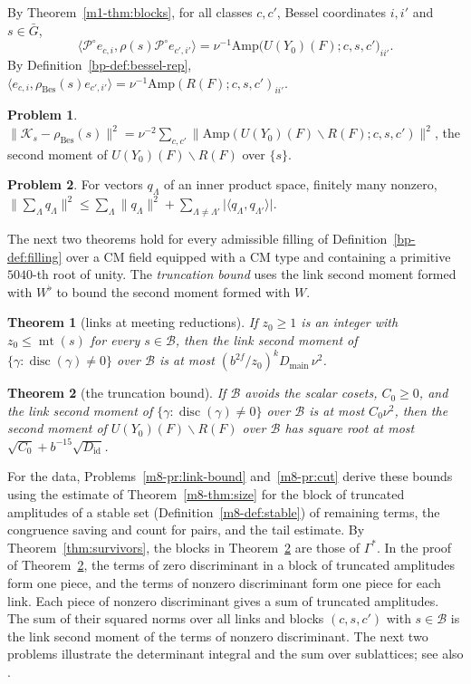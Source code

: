 \documentclass[reqno]{amsart}
\theoremstyle{definition}
\newtheorem{problem}{Problem}[section]
\theoremstyle{plain}
\newtheorem{theorem}{Theorem}[section]
\theoremstyle{remark}
\newcommand{\Kc}{\mathcal K}
\newcommand{\Pc}{\mathcal P}
\newcommand{\Bc}{\mathcal B}
\newcommand{\Gb}{\bar G}
\newcommand{\rB}{\rho_{\mathrm{Bes}}}
\newcommand{\Amp}{\mathrm{Amp}}
\newcommand{\Did}{D_{\mathrm{id}}}
\newcommand{\Dmain}{D_{\mathrm{main}}}
\newcommand{\disc}{\operatorname{disc}}
\newcommand{\mt}{\operatorname{mt}}
\begin{document}
By Theorem~\ref{m1-thm:blocks}, for all classes \(c,c'\), Bessel coordinates \(i,i'\) and \(s\in\Gb\),
\[
 \langle\Pc^\circ e_{c,i},\rho(s)\Pc^\circ e_{c',i'}\rangle=\nu^{-1}\Amp\bigl(U(Y_0)(F);c,s,c'\bigr)_{ii'}.
\]
By Definition~\ref{bp-def:bessel-rep}, \(\langle e_{c,i},\rB(s)e_{c',i'}\rangle=\nu^{-1}\Amp(R(F);c,s,c')_{ii'}\).

\begin{problem}\label{pr:hs-blocks}
\(\lVert\Kc_s-\rB(s)\rVert^2=\nu^{-2}\sum_{c,c'}\lVert\Amp(U(Y_0)(F)\smallsetminus R(F);c,s,c')\rVert^2\), the second moment of \(U(Y_0)(F)\smallsetminus R(F)\) over \(\{s\}\).
\end{problem}

\begin{problem}\label{pr:cross}
For vectors \(q_\Lambda\) of an inner product space, finitely many nonzero, \(\lVert\sum_\Lambda q_\Lambda\rVert^2\le\sum_\Lambda\lVert q_\Lambda\rVert^2+\sum_{\Lambda\ne\Lambda'}\lvert\langle q_\Lambda,q_{\Lambda'}\rangle\rvert\).
\end{problem}

The next two theorems hold for every admissible filling of Definition~\ref{bp-def:filling} over a CM field equipped with a CM type and containing a primitive \(5040\)-th root of unity.  The \emph{truncation bound} uses the link second moment formed with \(W^\flat\) to bound the second moment formed with \(W\).

\begin{theorem}[links at meeting reductions]\label{thm:link-bound}
If \(z_0\ge1\) is an integer with \(z_0\le\mt(s)\) for every \(s\in\Bc\), then the link second moment of \(\{\gamma:\disc(\gamma)\ne0\}\) over \(\Bc\) is at most \((b^{2f}/z_0)^k\Dmain\,\nu^2\).
\end{theorem}

\begin{theorem}[the truncation bound]\label{thm:cut}
If \(\Bc\) avoids the scalar cosets, \(C_0\ge0\), and the link second moment of \(\{\gamma:\disc(\gamma)\ne0\}\) over \(\Bc\) is at most \(C_0\nu^2\), then the second moment of \(U(Y_0)(F)\smallsetminus R(F)\) over \(\Bc\) has square root at most \(\sqrt{C_0}+b^{-15}\sqrt{\Did}\).
\end{theorem}

For the data, Problems~\ref{m8-pr:link-bound} and~\ref{m8-pr:cut} derive these bounds using the estimate of Theorem~\ref{m8-thm:size} for the block of truncated amplitudes of a stable set (Definition~\ref{m8-def:stable}) of remaining terms, the congruence saving and count for pairs, and the tail estimate.  By Theorem~\ref{thm:survivors}, the blocks in Theorem~\ref{thm:cut} are those of \(\Gamma^*\).  In the proof of Theorem~\ref{thm:cut}, the terms of zero discriminant in a block of truncated amplitudes form one piece, and the terms of nonzero discriminant form one piece for each link.  Each piece of nonzero discriminant gives a sum of truncated amplitudes.  The sum of their squared norms over all links and blocks \((c,s,c')\) with \(s\in\Bc\) is the link second moment of the terms of nonzero discriminant.  The next two problems illustrate the determinant integral and the sum over sublattices; see also \cite{Sch}.
\end{document}
